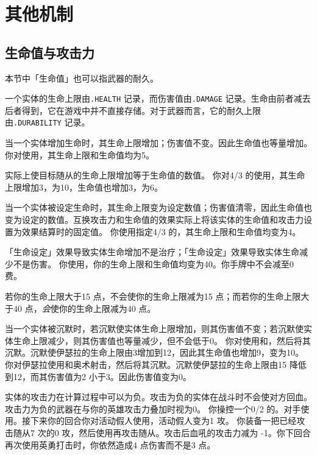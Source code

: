 \chapter{其他机制}

\section{生命值与攻击力}

本节中「生命值」也可以指武器的耐久。

一个实体的生命上限由\texttt{.HEALTH} 记录，而伤害值由\texttt{.DAMAGE} 记录。生命由前者减去后者得到，它在游戏中并不直接存储。对于武器而言，它的耐久上限由\texttt{.DURABILITY} 记录。

当一个实体增加生命时，其生命上限增加；伤害值不变。因此生命值也等量增加。
\example 你对使用，其生命上限和生命值均为5。

\notice {}实际上使目标随从的生命上限增加等于生命值的数值。
\example 你对4/3 的使用，其生命上限增加3，为10，生命值也增加3，为6。

当一个实体被设定生命时，其生命上限变为设定数值；伤害值清零，因此生命值也变为设定的数值。互换攻击力和生命值的效果实际上将该实体的生命值和攻击力设置为效果结算时的固定值。
\example 你使用指定4/3 的，其生命上限和生命值均变为4。

\notice 「生命设定」效果导致实体生命增加不是治疗；「生命设定」效果导致实体生命减少不是伤害。
\example 你使用，你的生命上限和生命值均变为40。你手牌中不会减至0 费。

\notice 若你的生命上限大于15 点，不会使你的生命上限减为15 点；而若你的生命上限大于40 点，\emph{会}使你的生命上限减为40 点。

当一个实体被沉默时，若沉默使实体生命上限增加，则其伤害值不变；若沉默使实体生命上限减少，则其伤害值也等量减少，但不会低于0。
\example 你对使用和，然后将其沉默。沉默使伊瑟拉的生命上限由3增加到12，因此其生命值也增加9，变为10。
\example 你对伊瑟拉使用和奥术射击，然后将其沉默。沉默使伊瑟拉的生命上限由15 降低到12，而其伤害值为2 小于3。因此伤害值变为0。

实体的攻击力在计算过程中可以为负。攻击为负的实体在战斗时不会使对方回血。攻击力为负的武器在与你的英雄攻击力叠加时视为0。
\example 你操控一个0/2 的。对手使用。接下来你的回合你对活动假人使用，活动假人变为1 攻。
\example 你装备一把已经攻击随从7 次的0 攻，然后使用再攻击随从。攻击后血吼的攻击力减为 -1。你下回合再次使用英勇打击时，你依然造成4 点伤害而不是3 点。

